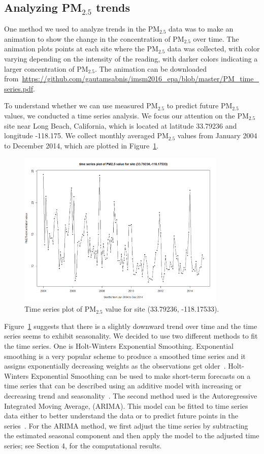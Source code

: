 \documentclass[10pt]{article}
\begin{document}
\subsection{Analyzing PM$_{2.5}$ trends}
One method we used to analyze trends in the PM$_{2.5}$ data was to make an
animation to show the change in the concentration of PM$_{2.5}$  over time. The
animation plots points at each site where the PM$_{2.5}$ data was collected,
with color varying depending on the intensity of the reading, with darker
colors indicating a larger concentration of PM$_{2.5}$. The animation can be downloaded 
from~\url{https://github.com/gautamsabnis/imsm2016_epa/blob/master/PM_time_series.pdf}.

To understand whether we can use measured PM$_{2.5}$ to predict future
PM$_{2.5}$ values, we conducted a time series analysis. We focus our
attention on the PM$_{2.5}$ site near Long Beach, California, which is located
at latitude 33.79236 and longitude -118.175. We collect monthly averaged
PM$_{2.5}$ values from January 2004 to December 2014, which are plotted in Figure~\ref{fig:time_series}.   

\begin{figure}[H]
\centering
\includegraphics[width = 100mm]{ts1.png}
\caption{Time series plot of PM$_{2.5}$ value for site (33.79236,	-118.17533).}
\label{fig:time_series}
\end{figure}

Figure~\ref{fig:time_series} suggests that there is a slightly 
downward trend over time and the time series seems to exhibit
seasonality. We decided to use two different methods to fit the
time series. One is Holt-Winters Exponential Smoothing. Exponential smoothing
is a very popular scheme to produce a smoothed time series and it assigns
exponentially decreasing weights as the observations get older~\cite{nist}.
Holt-Winters Exponential Smoothing can be used to make short-term forecasts on
a time series that can be described using an additive model with increasing or
decreasing trend and seasonality~\cite{littlebook}. The second method used is the
Autoregressive Integrated Moving Average, (ARIMA). This model can be fitted to
time series data either to better understand the data or to predict future
points in the series~\cite{wik}. 
For the ARIMA method, we first
adjust the time series by subtracting the estimated seasonal component and then
apply the model to the adjusted time series; see Section 4, for the computational 
results. 
\end{document}
